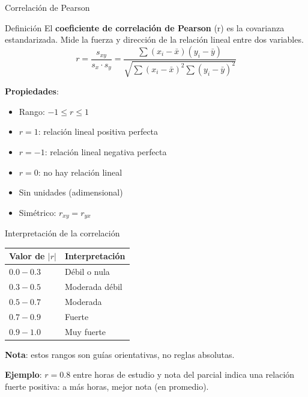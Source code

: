 \documentclass[aspectratio=169, 11pt]{beamer}
\begin{document}
\begin{frame}{Correlación de Pearson}
\begin{block}{Definición}
El \textbf{coeficiente de correlación de Pearson} (r) es la covarianza estandarizada. Mide la fuerza y dirección de la relación \alert{lineal} entre dos variables.
\[
r = \frac{s_{xy}}{s_x \cdot s_y} = \frac{\sum(x_i - \bar{x})(y_i - \bar{y})}{\sqrt{\sum(x_i-\bar{x})^2 \sum(y_i-\bar{y})^2}}
\]
\end{block}

\textbf{Propiedades}:
\begin{itemize}
\item Rango: $-1 \leq r \leq 1$
\item $r = 1$: relación lineal positiva perfecta
\item $r = -1$: relación lineal negativa perfecta
\item $r = 0$: no hay relación lineal
\item Sin unidades (adimensional)
\item Simétrico: $r_{xy} = r_{yx}$
\end{itemize}
\end{frame}

\begin{frame}{Interpretación de la correlación}
\begin{table}
\centering
\begin{tabular}{ll}
\toprule
\textbf{Valor de $|r|$} & \textbf{Interpretación} \\
\midrule
$0.0 - 0.3$ & Débil o nula \\
$0.3 - 0.5$ & Moderada débil \\
$0.5 - 0.7$ & Moderada \\
$0.7 - 0.9$ & Fuerte \\
$0.9 - 1.0$ & Muy fuerte \\
\bottomrule
\end{tabular}
\end{table}

\vspace{0.3em}
\textbf{Nota}: estos rangos son gu\'ias orientativas, no reglas absolutas.

\textbf{Ejemplo}: $r = 0.8$ entre horas de estudio y nota del parcial indica una relaci\'on fuerte positiva: a m\'as horas, mejor nota (en promedio).
\end{frame}
\end{document}
